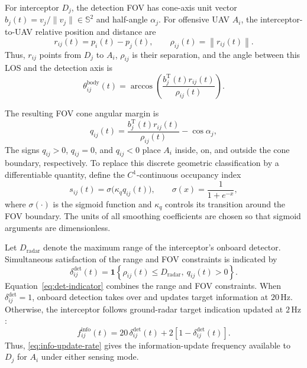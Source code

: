\documentclass{cja}
\begin{document}
For interceptor $D_j$, the detection FOV has cone-axis unit vector $b_j(t)=v_j/\|v_j\|\in\mathbb S^2$ and half-angle $\alpha_j$. For offensive UAV $A_i$, the interceptor-to-UAV relative position and distance are
\begin{equation}
r_{ij}(t)=p_i(t)-p_j(t),\qquad
\rho_{ij}(t)=\left\|r_{ij}(t)\right\|.
\end{equation}
Thus, $r_{ij}$ points from $D_j$ to $A_i$, $\rho_{ij}$ is their separation, and the angle between this LOS and the detection axis is
\begin{equation}
\theta_{ij}^{\mathrm{body}}(t)
=
\arccos
\left(
\frac{b_j^{\mathrm T}(t)r_{ij}(t)}
{\rho_{ij}(t)}
\right).
\end{equation}

The resulting FOV cone angular margin is
\begin{equation}
q_{ij}(t)
=
\frac{b_j^{\mathrm T}(t)r_{ij}(t)}
{\rho_{ij}(t)}
-\cos\alpha_j ,
\label{eq:qij-def}
\end{equation}
The signs $q_{ij}>0$, $q_{ij}=0$, and $q_{ij}<0$ place $A_i$ inside, on, and outside the cone boundary, respectively. To replace this discrete geometric classification by a differentiable quantity, define the $C^1$-continuous occupancy index
\begin{equation}
s_{ij}(t)
=
\sigma\!\bigl(\kappa_q q_{ij}(t)\bigr),\qquad
\sigma(x)=\frac{1}{1+e^{-x}},
\label{eq:sij-def}
\end{equation}
where $\sigma(\cdot)$ is the sigmoid function and $\kappa_q$ controls its transition around the FOV boundary. The units of all smoothing coefficients are chosen so that sigmoid arguments are dimensionless.

Let $D_{\mathrm{radar}}$ denote the maximum range of the interceptor's onboard detector. Simultaneous satisfaction of the range and FOV constraints is indicated by
\begin{equation}
\delta_{ij}^{\mathrm{det}}(t)
=
\mathbf{1}
\left\{
\rho_{ij}(t)\le D_{\mathrm{radar}},\
q_{ij}(t)>0
\right\}.
\label{eq:det-indicator}
\end{equation}
Equation~\eqref{eq:det-indicator} combines the range and FOV constraints. When $\delta_{ij}^{\mathrm{det}}=1$, onboard detection takes over and updates target information at $20\,\mathrm{Hz}$. Otherwise, the interceptor follows ground-radar target indication updated at $2\,\mathrm{Hz}$:
\begin{equation}
f_{ij}^{\mathrm{info}}(t)
=
20\,\delta_{ij}^{\mathrm{det}}(t)
+
2\left[1-\delta_{ij}^{\mathrm{det}}(t)\right].
\label{eq:info-update-rate}
\end{equation}
Thus, \eqref{eq:info-update-rate} gives the information-update frequency available to $D_j$ for $A_i$ under either sensing mode.
\end{document}
